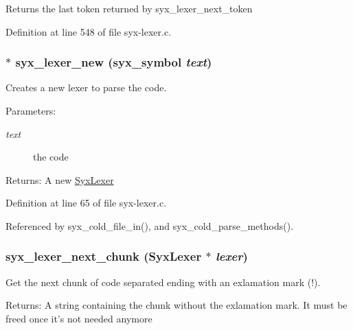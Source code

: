 Returns the last token returned by syx\_\-lexer\_\-next\_\-token 

Definition at line 548 of file syx-lexer.c.\hypertarget{syx-lexer_8c_a9c6c122b1b37e06487284478ba914e1}{
\subsubsection{$\ast$ syx\_\-lexer\_\-new ({\bf syx\_\-symbol} {\em text})}}
\label{syx-lexer_8c_a9c6c122b1b37e06487284478ba914e1}


Creates a new lexer to parse the code.

\begin{Desc}
\item[Parameters:]
\begin{description}
\item[{\em text}]the code \end{description}
\end{Desc}
\begin{Desc}
\item[Returns:]A new \hyperlink{struct_syx_lexer}{SyxLexer} \end{Desc}


Definition at line 65 of file syx-lexer.c.

Referenced by syx\_\-cold\_\-file\_\-in(), and syx\_\-cold\_\-parse\_\-methods().\hypertarget{syx-lexer_8c_b3f87e9420db1b5b6db7b5534d27411b}{
\subsubsection{ syx\_\-lexer\_\-next\_\-chunk ({\bf SyxLexer} $\ast$ {\em lexer})}}
\label{syx-lexer_8c_b3f87e9420db1b5b6db7b5534d27411b}


Get the next chunk of code separated ending with an exlamation mark (!).

\begin{Desc}
\item[Returns:]A string containing the chunk without the exlamation mark. It must be freed once it's not needed anymore \end{Desc}


